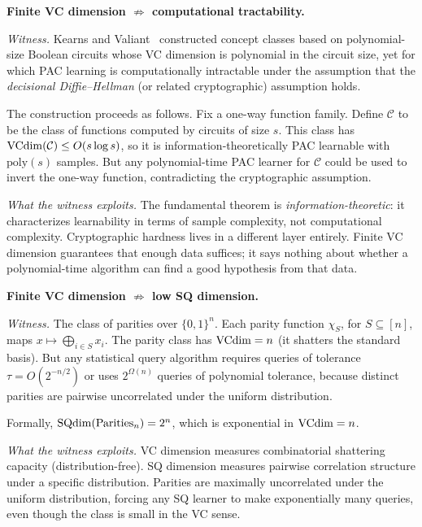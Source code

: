 
\begin{separation}
\textbf{Finite VC dimension $\not\Rightarrow$ computational
tractability.}

\medskip\noindent
\emph{Witness.}
Kearns and Valiant~\cite{KearnsValiant1994} constructed concept classes
based on polynomial-size Boolean circuits whose VC dimension is
polynomial in the circuit size, yet for which PAC learning is
computationally intractable under the assumption that the
\emph{decisional Diffie--Hellman} (or related cryptographic) assumption
holds.

The construction proceeds as follows. Fix a one-way function family.
Define $\mathcal{C}$ to be the class of functions computed by circuits
of size $s$. This class has $\mathrm{VCdim}(\mathcal{C}) \leq O(s \log s)$, so it
is information-theoretically PAC learnable with $\mathrm{poly}(s)$
samples. But any polynomial-time PAC learner for $\mathcal{C}$ could be
used to invert the one-way function, contradicting the cryptographic
assumption.

\medskip\noindent
\emph{What the witness exploits.}
The fundamental theorem is \emph{information-theoretic}: it
characterizes learnability in terms of sample complexity, not
computational complexity. Cryptographic hardness lives in a different
layer entirely. Finite VC dimension guarantees that enough data suffices;
it says nothing about whether a polynomial-time algorithm can find a
good hypothesis from that data.

\hfill\cite{KearnsValiant1994}
\end{separation}


\begin{separation}
\textbf{Finite VC dimension $\not\Rightarrow$ low SQ dimension.}

\medskip\noindent
\emph{Witness.}
The class of parities over $\{0,1\}^n$. Each parity function $\chi_S$,
for $S \subseteq [n]$, maps $x \mapsto \bigoplus_{i \in S} x_i$. The
parity class has $\mathrm{VCdim} = n$ (it shatters the standard basis). But any
statistical query algorithm requires queries of tolerance
$\tau = O(2^{-n/2})$ or uses $2^{\Omega(n)}$ queries of polynomial
tolerance, because distinct parities are pairwise uncorrelated under the
uniform distribution.

Formally, $\mathrm{SQdim}(\text{Parities}_n) = 2^n$, which is exponential in
$\mathrm{VCdim} = n$.

\medskip\noindent
\emph{What the witness exploits.}
VC dimension measures combinatorial shattering capacity
(distribution-free). SQ dimension measures pairwise correlation
structure under a specific distribution. Parities are maximally
uncorrelated under the uniform distribution, forcing any SQ learner to
make exponentially many queries, even though the class is small in the
VC sense.

\hfill\cite{BlumFurstJacksonKearnsMansourRudich1994}
\end{separation}


